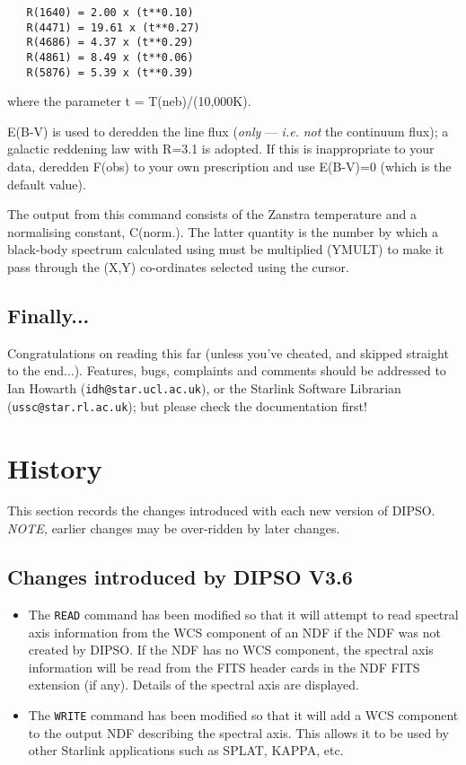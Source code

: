 \begin {description}
\begin{verbatim}
   R(1640) = 2.00 x (t**0.10)
   R(4471) = 19.61 x (t**0.27)
   R(4686) = 4.37 x (t**0.29)
   R(4861) = 8.49 x (t**0.06)
   R(5876) = 5.39 x (t**0.39)
\end{verbatim}

where the parameter t = T(neb)/(10,000K).

E(B-V) is used to deredden the line flux ({\em only} --- {\em i.e.}
{\em not} the continuum flux); a galactic reddening law with R=3.1 is
adopted. If this is inappropriate to your data, deredden F(obs) to
your own prescription and use E(B-V)=0 (which is the default value).

The output from this command consists of the Zanstra temperature and a
normalising constant, C(norm.). The latter quantity is the number by
which a black-body spectrum calculated using   must be multiplied
(YMULT) to make it pass through the (X,Y) co-ordinates selected using
the cursor.

\end{description}

\subsection{Finally...}
Congratulations on reading this far (unless you've cheated, and skipped
straight to the end...). Features, bugs, complaints and comments should
be addressed to Ian Howarth ({\tt{idh@star.ucl.ac.uk}}),  or the Starlink
Software Librarian ({\tt{ussc@star.rl.ac.uk}});  but please check the
documentation first!

\newpage

\section{\label{APP:HISTORY}History}


This section records the changes introduced with each new version of DIPSO.
{\em NOTE,} earlier changes may be over-ridden by later changes.

\subsection{Changes introduced by DIPSO V3.6}
\begin{itemize}
\item The {\tt READ} command has been modified so that it will attempt to
read spectral axis information from the WCS component of an NDF if the NDF
was not created by DIPSO. If the NDF has no WCS component, the spectral
axis information will be read from the FITS header cards in the NDF FITS
extension (if any). Details of the spectral axis are displayed.
\item The {\tt WRITE} command has been modified so that it will add a WCS
component to the output NDF describing the spectral axis. This allows it
to be used by other Starlink applications such as SPLAT, KAPPA, etc.
\end{itemize}

